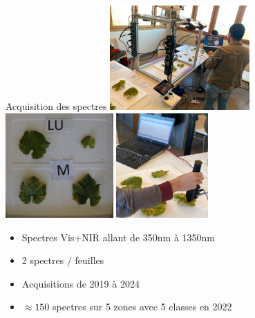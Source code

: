 \documentclass[presentation, aspectratio=169]{beamer}
\begin{document}
\begin{frame}{Acquisition des spectres}
  \includegraphics[height=4cm]{dispositif}
  \hfill
  \includegraphics[height=4cm]{planches}
  \hfill
  \includegraphics[height=4cm]{spectro}
  \begin{itemize}
  \item Spectres Vis+NIR allant de 350nm à 1350nm
  \item 2 spectres / feuilles
  \item Acquisitions de 2019 à 2024
  \item $\approx150$ spectres sur 5 zones avec 5 classes en 2022
  \end{itemize}
\end{frame}
\end{document}
